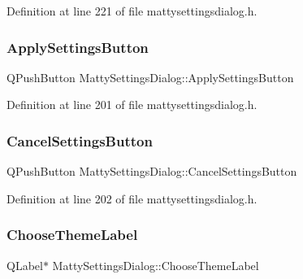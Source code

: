 Definition at line 221 of file mattysettingsdialog.\+h.

\hypertarget{classMattySettingsDialog_a60e2fb3f6bc9332d9d567132d05d181e}{}\label{classMattySettingsDialog_a60e2fb3f6bc9332d9d567132d05d181e} 
\subsubsection{\texorpdfstring{Apply\+Settings\+Button}{ApplySettingsButton}}
{\footnotesize\ttfamily Q\+Push\+Button Matty\+Settings\+Dialog\+::\+Apply\+Settings\+Button\hspace{0.3cm}{\ttfamily [private]}}



Definition at line 201 of file mattysettingsdialog.\+h.

\hypertarget{classMattySettingsDialog_a95c3a91578fb2dd6e823d883bc21b87a}{}\label{classMattySettingsDialog_a95c3a91578fb2dd6e823d883bc21b87a} 
\subsubsection{\texorpdfstring{Cancel\+Settings\+Button}{CancelSettingsButton}}
{\footnotesize\ttfamily Q\+Push\+Button Matty\+Settings\+Dialog\+::\+Cancel\+Settings\+Button\hspace{0.3cm}{\ttfamily [private]}}



Definition at line 202 of file mattysettingsdialog.\+h.

\hypertarget{classMattySettingsDialog_acd28094d640ba4cca05c8b23e00b3a59}{}\label{classMattySettingsDialog_acd28094d640ba4cca05c8b23e00b3a59} 
\subsubsection{\texorpdfstring{Choose\+Theme\+Label}{ChooseThemeLabel}}
{\footnotesize\ttfamily Q\+Label$\ast$ Matty\+Settings\+Dialog\+::\+Choose\+Theme\+Label\hspace{0.3cm}{\ttfamily [private]}}



